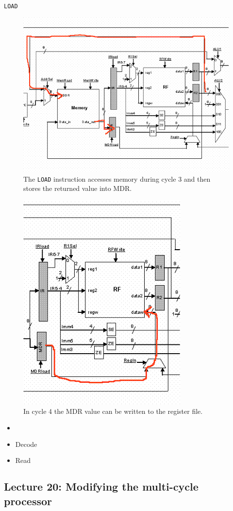 \documentclass[../notes.tex]{subfiles}
\begin{document}
\texttt{LOAD}

\begin{figure}[H]
	\centering
	\includegraphics[width=0.8\linewidth]{img/image_2022-11-03-13-55-59.png}
	\caption{The \texttt{LOAD} instruction accesses memory during cycle 3 and then stores the returned value into MDR.}
\end{figure}

\begin{figure}[H]
	\centering
	\includegraphics[width=0.8\linewidth]{img/image_2022-11-03-13-56-42.png}
	\caption{In cycle 4 the MDR value can be written to the register file.}
\end{figure}




\begin{itemize}
	\item 
\end{itemize}



\begin{itemize}
	\item Decode
	\item Read
\end{itemize}





\subsection{Lecture 20: Modifying the multi-cycle processor}
\end{document}

